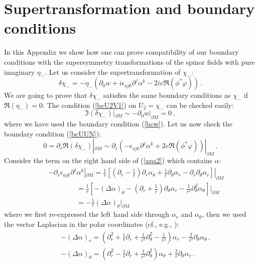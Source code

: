 \documentclass[a4paper,12pt]{article}
\begin{document}
\section{Supertransformation and boundary conditions}\label{susyapp}
In this Appendix we show how one can prove compatibility
of our boundary conditions with the supersymmetry transformations
of the spinor fields with pure imaginary $\eta_-$.
Let us consider the supertransformation of $\chi_-$:
\begin{equation}
\delta \chi_-=-\eta_- \left( \partial_0 w +i\epsilon_{ojk}
\partial^j \alpha^k -2i e \Re ( \phi^* \varphi ) \right) \,.
\label{delchim}
\end{equation}
We are going to prove that $\delta \chi_-$ satisfies the same
boundary conditions as $\chi_-$ if $\Re (\eta_-)=0$. The condition
(\ref{bcU2V1}) on $U_2=\chi_-$ can be checked easily:
\begin{equation}
\Im (\delta \chi_-) |_{\partial M} \sim -\partial_0 w |_{\partial
M}=0 \,,\label{apa1}
\end{equation}
where we have used the boundary condition (\ref{bcw}). Let us now
check the boundary condition (\ref{bcUUN}):
\begin{equation}
0=\partial_r \Re (\delta \chi_-)|_{\partial M} \sim
\partial_r \left( -\epsilon_{ojk}
\partial^j \alpha^k + 2e \Re ( \phi^* \varphi ) \right)|_{\partial M}
\,.\label{apa2}
\end{equation}
Consider the term on the right hand side of (\ref{apa2}) which
contains $\alpha$:
\begin{eqnarray}
&& -\partial_r \epsilon_{ojk} \partial^j \alpha^k|_{\partial M} =
\frac 1r \left[ \left( \partial_r - \frac 1r \right) \partial_r
\alpha_\theta + \frac 1r \partial_\theta \alpha_r
-\partial_r\partial_\theta \alpha_r \right]|_{\partial M} \nonumber \\
&&\qquad\qquad =\frac 1r \left[ -(\Delta \alpha)_\theta -\left (
\partial_r + \frac 1r \right)
\partial_\theta \alpha_r -\frac 1{r^2} \partial_\theta^2 \alpha_\theta
\right]|_{\partial M}\nonumber \\
&&\qquad\qquad =-\frac 1r(\Delta \alpha)_\theta |_{\partial M}
\label{apa3}
\end{eqnarray}
where we first re-expressed the left hand side through $\alpha_r$
and $\alpha_\theta$, then we used the vector Laplacian in the
polar coordinates (cf., e.g., \cite{Vassilevich:we}):
\begin{eqnarray}
&&-(\Delta \alpha)_r = \left( \partial_r^2 + \frac 1r \partial_r +
\frac 1{r^2} \partial_\theta^2 -\frac 1{r^2} \right) \alpha_r -
\frac 2{r^3} \partial_\theta \alpha_\theta \,,\nonumber \\
&&-(\Delta \alpha)_\theta = \left( \partial_r^2 -\frac 1r
\partial_r +\frac 1{r^2} \partial_\theta^2 \right) \alpha_\theta +
\frac 2r \partial_\theta \alpha_r \,.\label{apa4}
\end{eqnarray}
\end{document}
